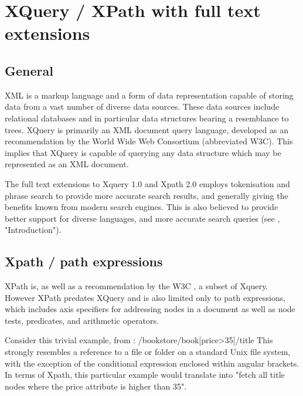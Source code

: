 \section{XQuery / XPath with full text extensions}
\subsection{General}
XML is a markup language and a form of data representation capable of storing data from a vast number of diverse data sources. These data sources include relational databases and in particular data structures bearing a resemblance to trees. XQuery is primarily an XML document query language, developed as an recommendation by the World Wide Web Consortium\cite{W3C00} (abbreviated W3C). This implies that XQuery is capable of querying any data structure which may be represented as an XML document.

The full text extensions to Xquery 1.0 and Xpath 2.0 employs tokenisation and phrase search to provide more accurate search results, and generally giving the benefits known from modern search engines. This is also believed to provide better support for diverse languages, and more accurate search queries (see \cite{W3C02}, "Introduction").

\subsection{Xpath / path expressions}
XPath is, as well as a recommendation by the W3C \cite{W3C01}, a subset of Xquery. However XPath predates XQuery and is also limited only to path expressions, which includes axis specifiers for addressing nodes in a document as well as node tests, predicates, and arithmetic operators.

Consider this trivial example, from \cite{W3S00}:
/bookstore/book[price>35]/title
This strongly resembles a reference to a file or folder on a standard Unix file system, with the exception of the conditional expression enclosed within angular brackets. In terms of Xpath, this particular example would translate into "fetch all title nodes where the price attribute is higher than 35".

